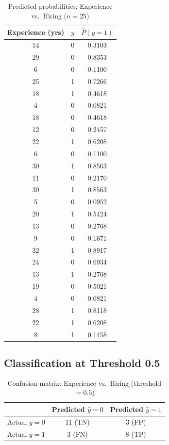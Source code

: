 \documentclass[12pt,a4paper]{article}
\begin{document}
\begin{table}[H]
\centering
\caption{Predicted probabilities: Experience vs.\ Hiring ($n = 25$)}
\begin{tabular}{ccc}
\toprule
Experience (yrs) & $y$ & $\hat{P}(y=1)$ \\
\midrule
14 & 0 & 0.3103 \\
29 & 0 & 0.8353 \\
 6 & 0 & 0.1100 \\
25 & 1 & 0.7266 \\
18 & 1 & 0.4618 \\
 4 & 0 & 0.0821 \\
18 & 0 & 0.4618 \\
12 & 0 & 0.2457 \\
22 & 1 & 0.6208 \\
 6 & 0 & 0.1100 \\
30 & 1 & 0.8563 \\
11 & 0 & 0.2170 \\
30 & 1 & 0.8563 \\
 5 & 0 & 0.0952 \\
20 & 1 & 0.5424 \\
13 & 0 & 0.2768 \\
 9 & 0 & 0.1671 \\
32 & 1 & 0.8917 \\
24 & 0 & 0.6934 \\
13 & 1 & 0.2768 \\
19 & 0 & 0.5021 \\
 4 & 0 & 0.0821 \\
28 & 1 & 0.8118 \\
22 & 1 & 0.6208 \\
 8 & 1 & 0.1458 \\
\bottomrule
\end{tabular}
\end{table}

\subsection{Classification at Threshold 0.5}

\begin{table}[H]
\centering
\caption{Confusion matrix: Experience vs.\ Hiring (threshold $= 0.5$)}
\begin{tabular}{lcc}
\toprule
 & Predicted $\hat{y}=0$ & Predicted $\hat{y}=1$ \\
\midrule
Actual $y=0$ & 11 (TN) & 3 (FP) \\
Actual $y=1$ & 3 (FN) & 8 (TP) \\
\bottomrule
\end{tabular}
\end{table}
\end{document}
